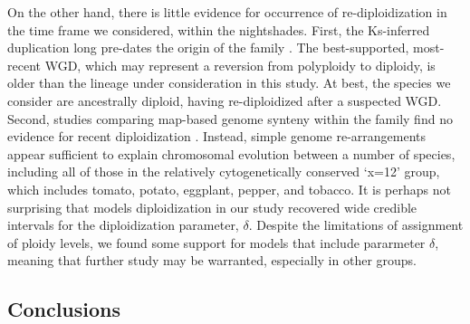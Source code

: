 On the other hand, there is little evidence for occurrence of re-diploidization in the time frame we considered, within the nightshades.
First, the Ks-inferred duplication long pre-dates the origin of the family \citep{sarkinen_2013}. 
The best-supported, most-recent WGD, which may represent a reversion from polyploidy to diploidy, is older than the lineage under consideration in this study.
At best, the species we consider are ancestrally diploid, having re-diploidized after a suspected WGD.
Second, studies comparing map-based genome synteny within the family find no evidence for recent diploidization \citep{wu_2010a}.
Instead, simple genome re-arrangements appear sufficient to explain chromosomal evolution between a number of species, including all of those in the relatively cytogenetically conserved `x=12' group, which includes tomato, potato, eggplant, pepper, and tobacco.
It is perhaps not surprising that models diploidization in our study recovered wide credible intervals for the diploidization parameter, $\delta$. 
Despite the limitations of assignment of ploidy levels, we found some support for models that include pararmeter $\delta$, meaning that further study may be warranted, especially in other groups.

%


\bigskip

\subsection*{Conclusions}

